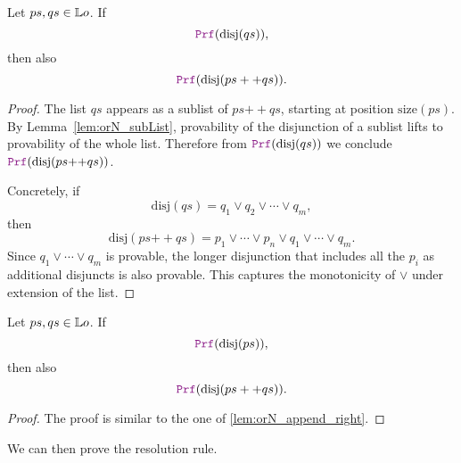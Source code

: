 \begin{lemma}\label{lem:orN_append_right}
Let $ps,qs \in \mathbb{L}o$. If 
\[
\prf(\mathrm{disj}(qs)),
\]
then also 
\[
\prf(\mathrm{disj}(ps ++ qs)).
\]
\begin{proof}
The list $qs$ appears as a sublist of $ps{++}qs$, starting at position $\mathrm{size}(ps)$.  
By Lemma~\ref{lem:orN_subList}, provability of the disjunction of a sublist lifts to provability of the whole list.  
Therefore from $\prf(\mathrm{disj}(qs))$ we conclude $\prf(\mathrm{disj}(ps{++}qs))$.  

Concretely, if 
\[
\mathrm{disj}(qs) = q_1 \lor q_2 \lor \cdots \lor q_m,
\]
then
\[
\mathrm{disj}(ps{++}qs) = p_1 \lor \cdots \lor p_n \lor q_1 \lor \cdots \lor q_m.
\]
Since $q_1 \lor \cdots \lor q_m$ is provable, the longer disjunction that includes all the $p_i$ as additional disjuncts is also provable.  
This captures the monotonicity of $\lor$ under extension of the list.
\end{proof}
\end{lemma}

\begin{lemma}\label{lem:orN_append_left}
Let $ps,qs \in \mathbb{L}o$. If 
\[
\prf(\mathrm{disj}(ps)),
\]
then also 
\[
\prf(\mathrm{disj}(ps ++ qs)).
\]
\begin{proof}
The proof is similar to the one of \cref{lem:orN_append_right}.
\end{proof}
\end{lemma}



We can then prove the resolution rule.

